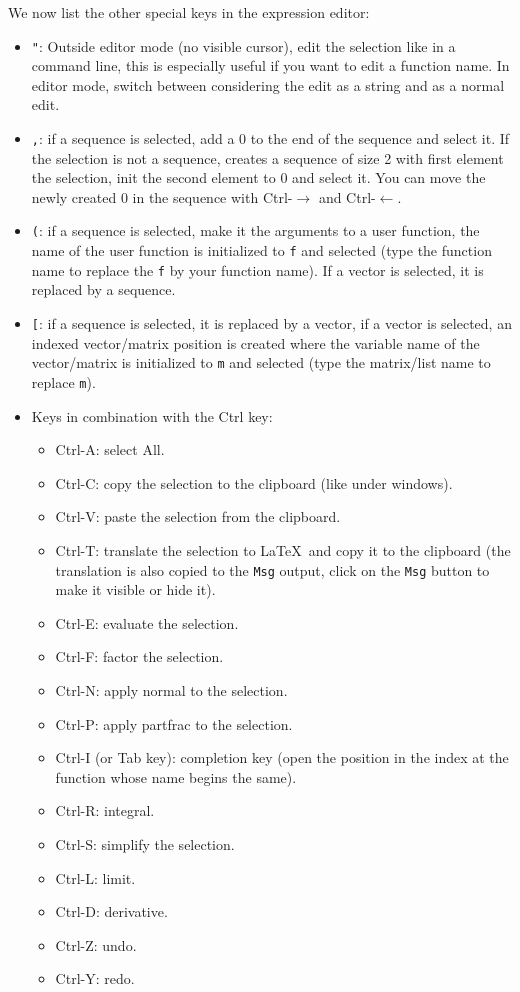 \documentclass{article}
\begin{document}
We now list the other special keys in the expression editor:
\begin{itemize}
\item \verb|"|: 
Outside editor mode (no visible cursor), 
edit the selection like in a command line, this is especially
useful if you want to edit a function name.
In editor mode, switch between considering the edit as a string
and as a normal edit. 
\item \verb|,|: if a sequence is selected, add a 0 to the end of the
sequence and select it. If the selection is not a sequence, creates
a sequence of size 2 with first element the selection, init the second
element to 0 and select it. You can move the newly created 0 in the
sequence with Ctrl-$\rightarrow$ and Ctrl-$\leftarrow$.
\item \verb|(|: if a sequence is selected, make it the arguments to a
user function, the name of the user function is initialized
to \verb|f| and selected (type the function name to replace 
the \verb|f| by your function name). If a vector is selected, it is replaced
by a sequence.
\item \verb|[|: if a sequence is selected, it is replaced by a vector,
if a vector is selected, an indexed vector/matrix position is created
where the variable name of the vector/matrix is initialized to
\verb|m| and selected (type the matrix/list name to replace \verb|m|).
\item Keys in combination with the Ctrl key:
\begin{itemize}
\item Ctrl-A: select All.
\item Ctrl-C: copy the selection to the clipboard (like under windows).
\item Ctrl-V: paste the selection from the clipboard.
\item Ctrl-T: translate the selection to \LaTeX\ and copy it to the clipboard
(the translation is also copied to the \verb|Msg| output, click
on the \verb|Msg| button to make it visible or hide it).
\item Ctrl-E: evaluate the selection.
\item Ctrl-F: factor the selection.
\item Ctrl-N: apply normal to the selection.
\item Ctrl-P: apply partfrac to the selection.
\item Ctrl-I (or Tab key): completion key (open the position in the index at the function
whose name begins the same).
\item Ctrl-R: integral.
\item Ctrl-S: simplify the selection.
\item Ctrl-L: limit.
\item Ctrl-D: derivative.
\item Ctrl-Z: undo.
\item Ctrl-Y: redo.
\end{itemize}
\end{itemize}
\end{document}
